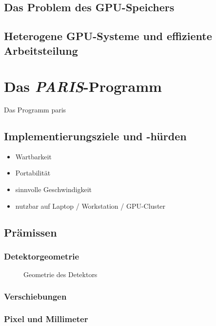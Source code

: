 \subsection{Das Problem des GPU-Speichers}

\subsection{Heterogene GPU-Systeme und effiziente Arbeitsteilung}

\section{Das \textit{PARIS}-Programm}

Das Programm \gls{paris}

\subsection{Implementierungsziele und -hürden}

\begin{itemize}
    \item Wartbarkeit
    \item Portabilität
    \item sinnvolle Geschwindigkeit
    \item nutzbar auf Laptop / Workstation / GPU-Cluster
\end{itemize}

\subsection{Prämissen}

\subsubsection{Detektorgeometrie}

\begin{figure}[!htb]
\caption{Geometrie des Detektors}
\label{fig:det_geometrie}
\end{figure}

\subsubsection{Verschiebungen}

\subsubsection{Pixel und Millimeter}

